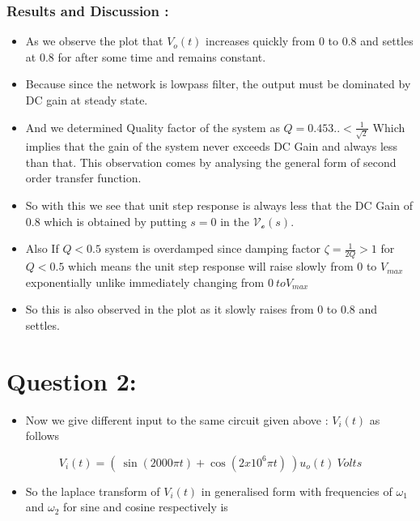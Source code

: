 \documentclass[10pt,a4paper]{article}
\providecommand{\tightlist}{%
      \setlength{\itemsep}{0pt}\setlength{\parskip}{0pt}}
\begin{document}
    \subsubsection{Results and Discussion :}\label{results-and-discussion}

\begin{itemize}
\item
  As we observe the plot that \(V_{o}(t)\) increases quickly from 0 to
  0.8 and settles at 0.8 for after some time and remains constant.
\item
  Because since the network is lowpass filter, the output must be
  dominated by DC gain at steady state.
\item
  And we determined Quality factor of the system as
  \(Q = 0.453.. < \frac{1}{\sqrt{2}}\) Which implies that the gain of
  the system never exceeds DC Gain and always less than that. This
  observation comes by analysing the general form of second order
  transfer function.
\item
  So with this we see that unit step response is always less that the DC
  Gain of \(0.8\) which is obtained by putting \(s=0\) in the
  \(\mathcal{V_{o}}(s)\).
\item
  Also If \(Q < 0.5\) system is overdamped since damping factor
  \(\zeta = \frac{1}{2Q} > 1\) for \(Q<0.5\) which means the unit step
  response will raise slowly from 0 to \(V_{max}\) exponentially unlike
  immediately changing from \(0 \ to V_{max}\)
\item
  So this is also observed in the plot as it slowly raises from 0 to 0.8
  and settles.
\end{itemize}

    \section{Question 2:}\label{question-2}

\begin{itemize}
\tightlist
\item
  Now we give different input to the same circuit given above :
  \(V_{i}(t)\) as follows
\end{itemize}

\begin{equation}
V_{i}(t) = ( \ \sin(2000\pi t) + \cos(2x10^{6}\pi t) \ )u_{o}(t) \ Volts
\end{equation}

\begin{itemize}
\tightlist
\item
  So the laplace transform of \(V_{i}(t)\) in generalised form with
  frequencies of \(\omega_1\) and \(\omega_2\) for sine and cosine
  respectively is
\end{itemize}
\end{document}
